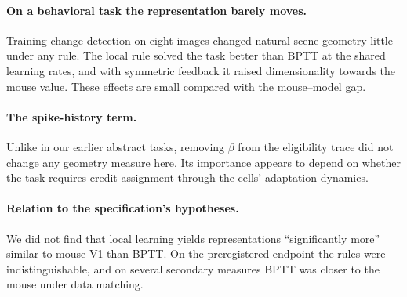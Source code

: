 \paragraph{On a behavioral task the representation barely moves.} Training change detection on
eight images changed natural-scene geometry little under any rule. The local rule solved the task
better than BPTT at the shared learning rates, and with symmetric feedback it raised
dimensionality towards the mouse value. These effects are small compared with the
mouse--model gap.

\paragraph{The spike-history term.} Unlike in our earlier abstract tasks, removing $\beta$ from the
eligibility trace did not change any geometry measure here. Its importance appears to depend on
whether the task requires credit assignment through the cells' adaptation dynamics.

\paragraph{Relation to the specification's hypotheses.} We did not find that local learning yields
representations ``significantly more'' similar to mouse V1 than BPTT. On the preregistered endpoint
the rules were indistinguishable, and on several secondary measures BPTT was closer to the mouse
under data matching.


